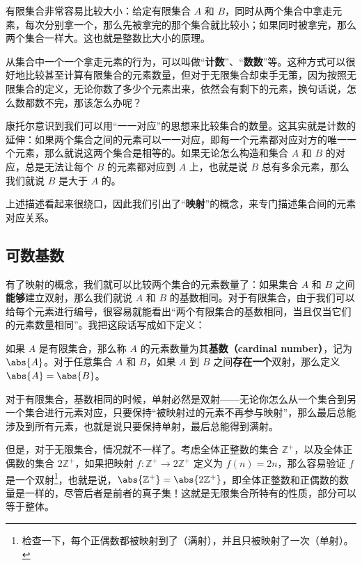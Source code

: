 有限集合非常容易比较大小：给定有限集合 $A$ 和 $B$，同时从两个集合中拿走元素，每次分别拿一个，那么先被拿完的那个集合就比较小；如果同时被拿完，那么两个集合一样大。这也就是整数比大小的原理。

从集合中一个一个拿走元素的行为，可以叫做“\textbf{计数}”、“\textbf{数数}”等。这种方式可以很好地比较甚至计算有限集合的元素数量，但对于无限集合却束手无策，因为按照无限集合的定义，无论你数了多少个元素出来，依然会有剩下的元素，换句话说，怎么数都数不完，那该怎么办呢？

康托尔意识到我们可以用“一一对应”的思想来比较集合的数量。这其实就是计数的延伸：如果两个集合之间的元素可以一一对应，即每一个元素都对应对方的唯一一个元素，那么就说这两个集合是相等的。如果无论怎么构造和集合 $A$ 和 $B$ 的对应，总是无法让每个 $B$ 的元素都对应到 $A$ 上，也就是说 $B$ 总有多余元素，那么我们就说 $B$ 是大于 $A$ 的。

上述描述看起来很绕口，因此我们引出了“\textbf{映射}”的概念，来专门描述集合间的元素对应关系。



\subsection{可数基数}\label{sub_CardiN_1}


有了映射的概念，我们就可以比较两个集合的元素数量了：如果集合 $A$ 和 $B$ 之间\textbf{能够}建立双射，那么我们就说 $A$ 和 $B$ 的基数相同。对于有限集合，由于我们可以给每个元素进行编号，很容易就能看出“两个有限集合的基数相同，当且仅当它们的元素数量相同”。我把这段话写成如下定义：

\begin{definition}{}\label{def_CardiN_1}
如果 $A$ 是有限集合，那么称 $A$ 的元素数量为其\textbf{基数（cardinal number）}，记为 $\abs{A}$。对于任意集合 $A$ 和 $B$，如果 $A$ 到 $B$ 之间\textbf{存在一个}双射，那么定义 $\abs{A}=\abs{B}$。
\end{definition}


对于有限集合，基数相同的时候，单射必然是双射——无论你怎么从一个集合到另一个集合进行元素对应，只要保持“被映射过的元素不再参与映射”，那么最后总能涉及到所有元素，也就是说只要保持单射，最后总能得到满射。

但是，对于无限集合，情况就不一样了。考虑全体正整数的集合 $\mathbb{Z}^+$，以及全体正偶数的集合 $2\mathbb{Z}^+$，如果把映射 $f:\mathbb{Z}^+\rightarrow2\mathbb{Z}^+$ 定义为 $f(n)=2n$，那么容易验证 $f$ 是一个双射\footnote{检查一下，每个正偶数都被映射到了（满射），并且只被映射了一次（单射）。}，也就是说，$\abs{\mathbb{Z}^+}=\abs{2\mathbb{Z}^+}$，即全体正整数和正偶数的数量是一样的，尽管后者是前者的真子集！这就是无限集合所特有的性质，部分可以等于整体。

